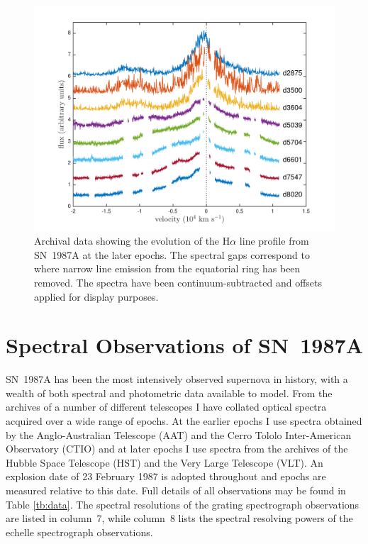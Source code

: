 \begin{figure}
\centering
\includegraphics[trim =45 10 45 15,clip=true,scale=0.8]{chapters/chapter5/images/Ha_evol_late_1col.pdf}
\caption{Archival data showing the evolution of the H$\alpha$
line profile from SN~1987A at the later epochs. The spectral gaps 
correspond to where narrow line emission from the equatorial ring has been 
removed. The spectra have been continuum-subtracted and offsets applied 
for display purposes.}
\label{Ha_evol_late}
\end{figure}



\section{Spectral Observations of SN~1987A}
\label{spectra}


SN~1987A has been the most intensively observed supernova in history, with 
a wealth of both spectral and photometric data available to model.  From 
the archives of a number of different telescopes I have collated optical 
spectra acquired over a wide range of epochs.  At the earlier epochs I 
use spectra obtained by the Anglo-Australian Telescope (AAT) and the Cerro 
Tololo Inter-American Observatory (CTIO) and at later epochs I 
use spectra from the archives of the Hubble Space Telescope (HST) and the Very 
Large Telescope (VLT).  An explosion date of 23 February 1987 is adopted 
throughout and epochs are measured relative to this date.  Full details of 
all observations may be found in Table \ref{tb:data}. The spectral 
resolutions of the grating spectrograph observations are listed in 
column~7, while column~8 lists the spectral resolving powers of the 
echelle spectrograph observations.




